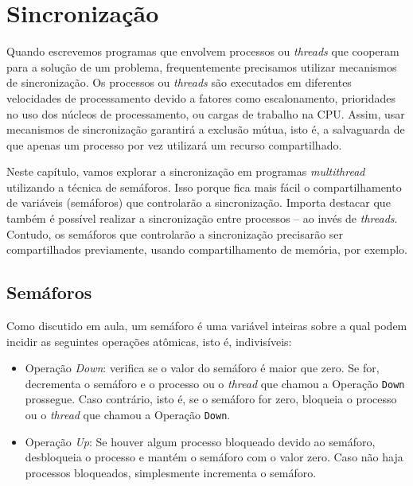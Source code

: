\chapter{Sincronização}
Quando escrevemos programas que envolvem processos ou \textit{threads} que cooperam para a solução de um problema, frequentemente precisamos utilizar mecanismos de sincronização. Os processos ou \textit{threads} são executados em diferentes velocidades de processamento devido a fatores como escalonamento, prioridades no uso dos núcleos de processamento, ou cargas de trabalho na CPU.  Assim, usar mecanismos de sincronização garantirá a exclusão mútua, isto é, a salvaguarda de que apenas um processo por vez utilizará um recurso compartilhado.

Neste capítulo, vamos explorar a sincronização em programas \textit{multithread} utilizando a técnica de semáforos. Isso porque fica mais fácil o compartilhamento de variáveis (semáforos) que controlarão a sincronização. Importa destacar que também é possível realizar a sincronização entre processos -- ao invés de \textit{threads}. Contudo, os semáforos que controlarão a sincronização precisarão ser compartilhados previamente, usando compartilhamento de memória, por exemplo. 

\section{Semáforos}

Como discutido em aula, um semáforo é uma variável inteiras sobre a qual podem incidir as seguintes operações atômicas, isto é, indivisíveis:
\begin{itemize}
    \item Operação \textit{Down}: verifica se o valor do semáforo é maior que zero. Se for, decrementa o semáforo e o processo ou o \textit{thread} que chamou a Operação \texttt{Down} prossegue. Caso contrário, isto é, se o semáforo for zero, bloqueia o processo ou o \textit{thread} que chamou a Operação \texttt{Down}.
    \item Operação \textit{Up}: Se houver algum processo bloqueado devido ao semáforo, desbloqueia o processo e mantém o semáforo com o valor zero. Caso não haja processos bloqueados, simplesmente incrementa o semáforo.
\end{itemize}

